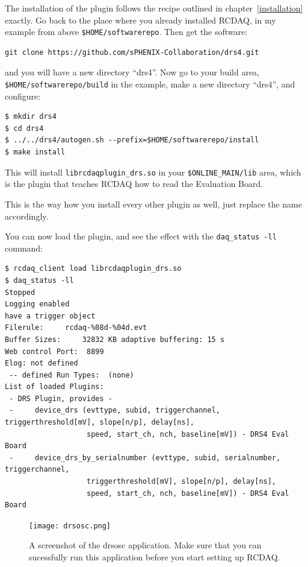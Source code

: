 \documentclass{article}[11pt]
\begin{document}
The installation of the plugin follows the recipe outlined in
chapter~\ref{installation} exactly. Go back to the place where you
already installed RCDAQ, in my example from above
\verb|$HOME/softwarerepo|. Then get the software:

\begin{verbatim}
git clone https://github.com/sPHENIX-Collaboration/drs4.git
\end{verbatim}

and you will have a new directory ``drs4''. Now go to your build area,
\verb|$HOME/softwarerepo/build| in the example, make a new directory ``drs4'',
and configure:

\begin{verbatim} 
$ mkdir drs4 
$ cd drs4 
$ ../../drs4/autogen.sh --prefix=$HOME/softwarerepo/install 
$ make install
\end{verbatim}

This will install \verb|librcdaqplugin_drs.so| in your
\verb|$ONLINE_MAIN/lib| area, which is the plugin that teaches RCDAQ how
to read the Evaluation Board.

This is the way how you install every other plugin as well, just
replace the name accordingly.

You can now load the plugin, and see the effect with the
\verb|daq_status -ll| command:

{\footnotesize 
\begin{verbatim}
$ rcdaq_client load librcdaqplugin_drs.so
$ daq_status -ll
Stopped
Logging enabled
have a trigger object
Filerule:     rcdaq-%08d-%04d.evt
Buffer Sizes:     32832 KB adaptive buffering: 15 s
Web control Port:  8899
Elog: not defined
 -- defined Run Types:  (none)
List of loaded Plugins:
 - DRS Plugin, provides -
 -     device_drs (evttype, subid, triggerchannel, triggerthreshold[mV], slope[n/p], delay[ns], 
                   speed, start_ch, nch, baseline[mV]) - DRS4 Eval Board
 -     device_drs_by_serialnumber (evttype, subid, serialnumber, triggerchannel, 
                   triggerthreshold[mV], slope[n/p], delay[ns], 
                   speed, start_ch, nch, baseline[mV]) - DRS4 Eval Board
\end{verbatim}
}

\begin{figure}
  \centering
  \texttt{[image: drsosc.png]}
  \caption{\label{drsosc}A screenshot of the drsosc application. Make
    sure that you can sucessfully run this application before you
    start setting up RCDAQ.}
\end{figure}
\end{document}

